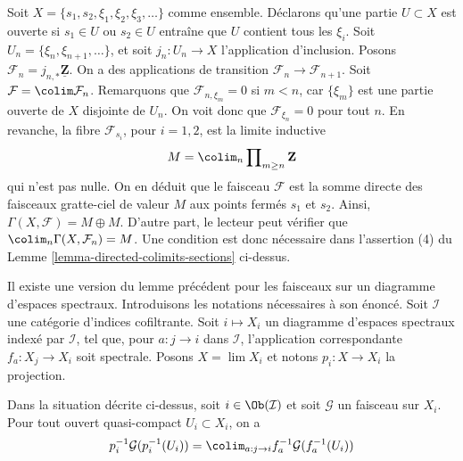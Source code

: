 \begin{example}
\label{example-conditions-needed-colimit}
Soit $X = \{s_1, s_2, \xi_1, \xi_2, \xi_3, \ldots\}$ comme ensemble.
Déclarons qu'une partie $U \subset X$ est ouverte
si $s_1 \in U$ ou $s_2 \in U$ entraîne que $U$ contient tous les
$\xi_i$. Soit $U_n = \{\xi_n, \xi_{n + 1}, \ldots\}$, et
soit $j_n : U_n \to X$ l'application d'inclusion.
Posons $\mathcal{F}_n = j_{n, *}\underline{\mathbf{Z}}$.
On a des applications de transition $\mathcal{F}_n \to \mathcal{F}_{n + 1}$.
Soit $\mathcal{F} = \colim \mathcal{F}_n$.
Remarquons que $\mathcal{F}_{n, \xi_m} = 0$ si $m < n$,
car $\{\xi_m\}$ est une partie ouverte de $X$ disjointe de $U_n$.
On voit donc que $\mathcal{F}_{\xi_n} = 0$ pour tout $n$.
En revanche, la fibre $\mathcal{F}_{s_i}$, pour $i = 1, 2$,
est la limite inductive
$$
M = \colim_n \prod\nolimits_{m \geq n} \mathbf{Z}
$$
qui n'est pas nulle. On en déduit que le faisceau
$\mathcal{F}$ est la somme directe des
faisceaux gratte-ciel de valeur $M$ aux points fermés
$s_1$ et $s_2$. Ainsi, $\Gamma(X, \mathcal{F}) = M \oplus M$.
D'autre part, le lecteur peut vérifier que
$\colim_n \Gamma(X, \mathcal{F}_n) = M$.
Une condition est donc nécessaire dans l'assertion (4) du
Lemme \ref{lemma-directed-colimits-sections} ci-dessus.
\end{example}

\noindent
Il existe une version du lemme précédent pour les faisceaux sur un diagramme
d'espaces spectraux. Introduisons les notations nécessaires à son énoncé.
Soit $\mathcal{I}$ une catégorie d'indices cofiltrante.
Soit $i \mapsto X_i$ un diagramme d'espaces spectraux indexé par $\mathcal{I}$,
tel que, pour $a : j \to i$ dans $\mathcal{I}$, l'application correspondante
$f_a : X_j \to X_i$ soit spectrale. Posons $X = \lim X_i$ et notons
$p_i : X \to X_i$ la projection.

\begin{lemma}
\label{lemma-compute-pullback-to-limit}
Dans la situation décrite ci-dessus, soit $i \in \Ob(\mathcal{I})$ et soit
$\mathcal{G}$ un faisceau sur $X_i$. Pour tout ouvert quasi-compact $U_i \subset X_i$,
on a
$$
p_i^{-1}\mathcal{G}(p_i^{-1}(U_i)) =
\colim_{a : j \to i} f_a^{-1}\mathcal{G}(f_a^{-1}(U_i))
$$
\end{lemma}

